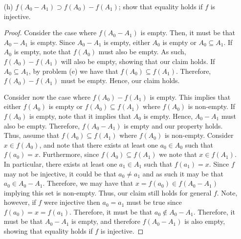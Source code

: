 \documentclass[12pt]{article}
\begin{document}
\begin{enumerate}
\begin{proof}
		Let $x \in f(A_0) \cap f(A_1)$. Thus, $x \in f(A_0)$ and $x \in f(A_1)$.
		As such, there exists at least one $a_0 \in A_0$ such that $f(a_0) = x$
		and at least one $a_1 \in A_1$ such that $f(a_1) = x$. Since $f$ is not injective,
		it may be that $a_0 \neq a_1$. Therefore, it may be that $a_0, a_1 \notin A_0 \cap A_1$.
		This can be true for any $a \in A$ such that $f(a) = x$. Hence, it may be
		that $x \notin f(A_0 \cap A_1)$ for general $f$. If $f$ is injective,
		note that it must be that $a = a_0 = a_1$ as such, since $a_0 \in A_0$ and 
		$a_1 \in A_1$, we have that $a \in A_0 \cap A_1$ (where $a$ stands for any $a \in A$
		that could have mapped onto $x$ through $f$). Therefore, $f(a) \in f(A_0 \cap A_1)$,
		and since $x = f(a)$ we can conclude that $x \in f(A_0 \cap A_1)$. Hence,
		$f(A_0) \cap f(A_1) \subseteq f(A_0 \cap A_1)$, and we can conclude that
		$f(A_0 \cap A_1) = f(A_0) \cap f(A_1)$ for $f$ injective.
	\end{proof}
	\item[(h)] $f(A_0 - A_1) \supset f(A_0) - f(A_1)$; show that equality holds if 
	$f$ is injective.
	\begin{proof}
		Consider the case where $f(A_0 - A_1)$ is empty. Then, it must be that
		$A_0 - A_1$ is empty. Since $A_0 - A_1$ is empty, either $A_0$ is empty
		or $A_0 \subseteq A_1$. If $A_0$ is empty, note that $f(A_0)$ must also be empty.
		As such, $f(A_0) - f(A_1)$ will also be empty, showing that our claim holds.
		If $A_0 \subseteq A_1$, by problem (e) we have that $f(A_0) \subseteq f(A_1)$.
		Therefore, $f(A_0) - f(A_1)$ must be empty. Hence, our claim holds. 
		
		Consider now the case where $f(A_0) - f(A_1)$ is empty. This implies that
		either $f(A_0)$ is empty or $f(A_0) \subseteq f(A_1)$ where $f(A_0)$ is non-empty. 
		If $f(A_0)$ is empty, note that it implies that $A_0$ is empty. Hence, $A_0 - A_1$
		must also be empty. Therefore, $f(A_0 - A_1)$ is empty and our property holds. 
		Thus, assume that $f(A_0) \subseteq f(A_1)$ where $f(A_0)$ is non-empty. Consider
		$x \in f(A_0)$, and note that there exists at least one $a_0 \in A_0$ such
		that $f(a_0) = x$. Furthermore, since $f(A_0) \subseteq f(A_1)$ we note that
		$x \in f(A_1)$. In particular, there exists at least one $a_1 \in A_1$ such
		that $f(a_1) = x$. Since $f$ may not be injective, it could be that $a_0 \neq a_1$
		and as such it may be that $a_0 \in A_0 - A_1$. Therefore, we may have that
		$x = f(a_0) \in f(A_0 - A_1)$ implying this set is non-empty. Thus, our claim
		still holds for general $f$. Note, however, if $f$ were injective then
		$a_0 = a_1$ must be true since $f(a_0) = x = f(a_1)$. Therefore, it must be 
		that $a_0 \notin A_0 - A_1$. Therefore, it must be that $A_0 - A_1$ is empty, 
		and therefore $f(A_0 - A_1)$ is also empty, showing that equality holds if $f$
		is injective.
		

\end{proof}
\end{enumerate}
\end{document}
